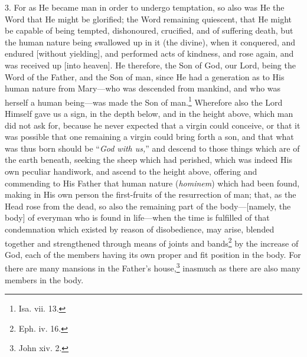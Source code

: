 3. For as He became man in order to undergo temptation, so also was He the Word that He might be glorified; the Word remaining quiescent, that He might be capable of being tempted, dishonoured, crucified, and of suffering death, but the human nature being swallowed up in it (the divine), when it conquered, and endured [without yielding], and performed acts of kindness, and rose again, and was received up [into heaven]. He therefore, the Son of God, our Lord, being the Word of the Father, and the Son of man, since He had a generation as to His human nature from Mary—who was descended from mankind, and who was herself a human being—was made the Son of man.\footnote{Isa. vii. 13.} Wherefore also the Lord Himself gave us a sign, in the depth below, and in the height above, which man did not ask for, because he never expected that a virgin could conceive, or that it was possible that one remaining a virgin could bring forth a son, and that what was thus born should be “\emph{God with us,}” and descend to those things which are of the earth beneath, seeking the sheep which had perished, which was indeed His own peculiar handiwork, and ascend to the height above, offering and commending to His Father that human nature (\emph{hominem}) which had been found, making in His own person the first-fruits of the resurrection of man; that, as the Head rose from the dead, so also the remaining part of the body—[namely, the body] of everyman who is found in life—when the time is fulfilled of that condemnation which existed by reason of disobedience, may arise, blended together and strengthened through means of joints and bands\footnote{Eph. iv. 16.} by the increase of God, each of the members having its own proper and fit position in the body. For there are many mansions in the Father’s house,\footnote{John xiv. 2.} inasmuch as there are also many members in the body.


